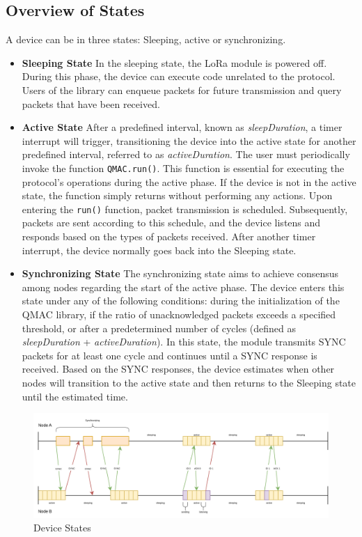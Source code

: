 \subsection*{Overview of States}
A device can be in three states: Sleeping, active or synchronizing.
\begin{itemize}
	\item \textbf{Sleeping State} In the sleeping state, the LoRa module is powered off. During this phase, the device can execute code unrelated to the protocol.
	      Users of the library can enqueue packets for future transmission and query packets that have been received.
	\item \textbf{Active State} After a predefined interval, known as \textit{sleepDuration}, a timer interrupt will trigger, transitioning the device into the active state for another predefined interval, referred to as \textit{activeDuration}. The user must periodically invoke the function \texttt{QMAC.run()}.
	      This function is essential for executing the protocol's operations during the active phase.
	      If the device is not in the active state, the function simply returns without performing any actions. Upon entering the \texttt{run()} function, packet transmission is scheduled. Subsequently, packets are sent according to this schedule, and the device listens and responds based on the types of packets received. After another timer interrupt, the device normally goes back into the Sleeping state.
	\item \textbf{Synchronizing State} The synchronizing state aims to achieve consensus among nodes regarding the start of the active phase. The device enters this state under any of the following conditions: during the initialization of the QMAC library, if the ratio of unacknowledged packets exceeds a specified threshold, or after a predetermined number of cycles (defined as \textit{sleepDuration} + \textit{activeDuration}). In this state, the module transmits SYNC packets for at least one cycle and continues until a SYNC response is received. Based on the SYNC responses, the device estimates when other nodes will transition to the active state and then returns to the Sleeping state until the estimated time.
\end{itemize}


\begin{figure}[h]
	\centering
	\includegraphics[width=\textwidth]{figures/qmac-time.png}
	\caption{Device States}
\end{figure}

